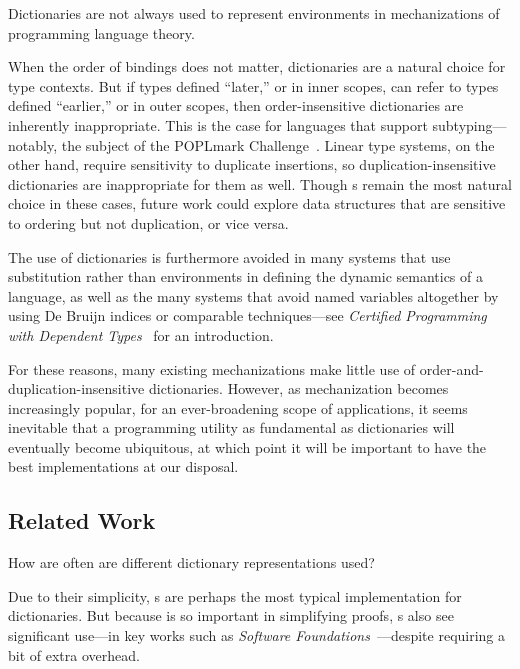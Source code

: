 
Dictionaries are not always used to represent environments in mechanizations of programming language theory.

When the order of bindings does not matter, dictionaries are a natural choice for type contexts.
%
But if types defined ``later,'' or in inner scopes, can refer to types defined ``earlier,'' or in outer scopes, then order-insensitive dictionaries are inherently inappropriate.
%
This is the case for languages that support subtyping---notably, the subject of the POPLmark Challenge~\citep{POPLmark}.
%
Linear type systems, on the other hand, require sensitivity to duplicate insertions, so duplication-insensitive dictionaries are inappropriate for them as well.
%
Though {\sal}s remain the most natural choice in these cases, future work could explore data structures that are sensitive to ordering but not duplication, or vice versa.

The use of dictionaries is furthermore avoided in many systems that use substitution rather than environments
%
in defining the dynamic semantics of a language, as well as the many systems that avoid named variables altogether by using De Bruijn indices or comparable techniques---see \emph{Certified Programming with Dependent Types}~\cite[Library Firstorder]{cpdt} for an introduction.

For these reasons, many existing mechanizations make little use of order-and-duplication-insensitive dictionaries. 
%
However, as mechanization becomes increasingly popular, for an ever-broadening scope of applications,
%
it seems inevitable that a programming utility as fundamental as dictionaries will eventually become ubiquitous, at which point it will be important to have the
%
best implementations at our disposal.

\subsection{Related Work}
\label{sec:Discussion:Related}

How are often are different dictionary representations used?

%
Due to their simplicity, {\sal}s are perhaps the most typical implementation for dictionaries.
%
But because \SemInj{} is so important in simplifying proofs, {\fpf}s also see significant use---in key works such as \emph{Software Foundations}~\cite[Maps]{Pierce:SF1}---despite requiring a bit of extra overhead.

